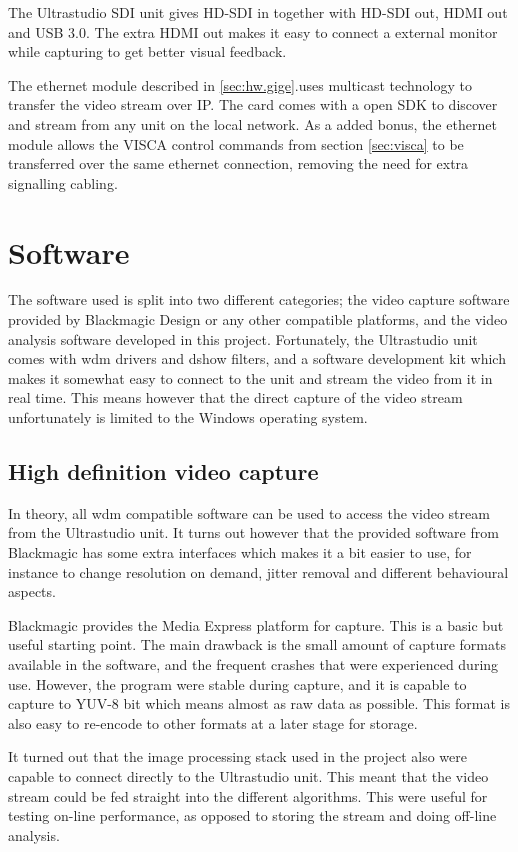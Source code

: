 The Ultrastudio SDI unit gives HD-SDI in together with HD-SDI out, HDMI out and USB 3.0. The 
extra HDMI out makes it easy to connect a external monitor while capturing to get better visual feedback.

The ethernet module described in \autoref{sec:hw.gige}.uses multicast technology to transfer the video stream over IP. The 
card comes with a open SDK to discover and stream from any unit on the local network. As a added bonus, the 
ethernet module allows the VISCA control commands from section \vref{sec:visca} to be transferred over the same 
ethernet connection, removing the need for extra signalling cabling.

\section{Software}
The software used is split into two different categories; the video capture software provided by Blackmagic 
Design or any other compatible platforms, and the video analysis software developed in this project. Fortunately, the Ultrastudio 
unit comes with \gls{wdm} drivers and \gls{dshow} 
filters, and a software development kit which makes it somewhat easy to connect to the unit and stream 
the video from it in real time. This means however that the direct capture of the video stream unfortunately is limited to the 
Windows operating system.

\subsection{High definition video capture}
In theory, all \gls{wdm} compatible software can be used to access the video stream from the Ultrastudio unit. It turns out
however that the provided software from Blackmagic has some extra interfaces which makes it a bit easier to use, for instance 
to change resolution on demand, jitter removal and different behavioural aspects.

Blackmagic provides the Media Express platform for capture. This is a basic but useful starting point. The main 
drawback is the small amount of capture formats available in the software, and the frequent crashes that were experienced 
during use. However, the program were stable during capture, and it is capable to capture to YUV-8 bit which means almost 
as raw data as possible. This format is also easy to re-encode to other formats at a later stage for storage. 

It turned out that the image processing stack used in the project also were capable to connect directly to the Ultrastudio unit. 
This meant that the video stream could be fed straight into the different algorithms. This were useful for 
testing on-line performance, as opposed to storing the stream and doing off-line analysis.

